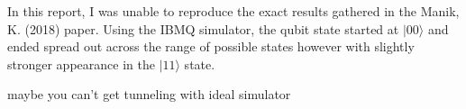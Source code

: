 \documentclass{article}
\begin{document}
In this report, I was unable to reproduce the exact results gathered in the Manik, K. (2018) \cite{manik} paper. Using the IBMQ simulator, the qubit state started at $|00\rangle$ and ended spread out across the range of possible states however with slightly stronger appearance in the $|11\rangle$ state. 

maybe you can't get tunneling with ideal simulator



\end{document}
